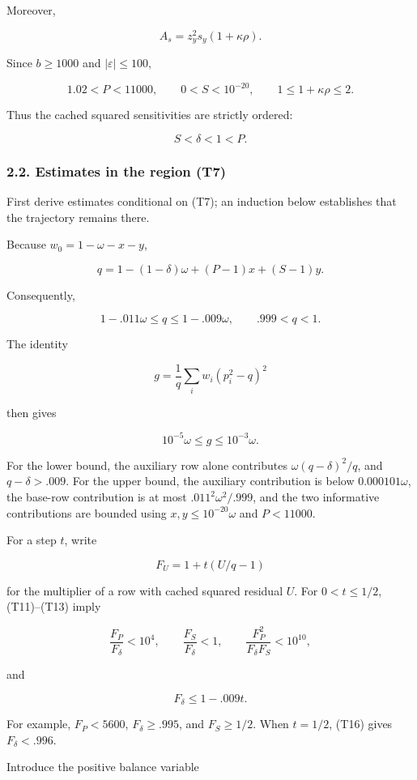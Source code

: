 Moreover,

\[
A_s=z_y^2s_y(1+\kappa\rho).
\tag{T10}
\]

Since \(b\ge1000\) and \(|\varepsilon|\le100\),

\[
1.02<P<11000,\qquad 0<S<10^{-20},
\qquad 1\le1+\kappa\rho\le2.
\tag{T11}
\]

Thus the cached squared sensitivities are strictly ordered:

\[
S<\delta<1<P.
\tag{T12}
\]

\subsubsection{2.2. Estimates in the region (T7)}

First derive estimates conditional on (T7); an induction below establishes that the trajectory remains there.

Because \(w_0=1-\omega-x-y\),

\[
q=1-(1-\delta)\omega+(P-1)x+(S-1)y.
\]

Consequently,

\[
1-.011\omega\le q\le1-.009\omega,
\qquad .999<q<1.
\tag{T13}
\]

The identity

\[
g=\frac1q\sum_i w_i(p_i^2-q)^2
\]

then gives

\[
10^{-5}\omega\le g\le10^{-3}\omega.
\tag{T14}
\]

For the lower bound, the auxiliary row alone contributes
\(\omega(q-\delta)^2/q\), and \(q-\delta>.009\).
For the upper bound, the auxiliary contribution is below
\(0.000101\omega\), the base-row contribution is at most
\(.011^2\omega^2/.999\), and the two informative contributions are bounded using \(x,y\le10^{-20}\omega\) and \(P<11000\).

For a step \(t\), write

\[
F_U=1+t(U/q-1)
\]

for the multiplier of a row with cached squared residual \(U\). For \(0<t\le1/2\), (T11)–(T13) imply

\[
\frac{F_P}{F_\delta}<10^4,\qquad
\frac{F_S}{F_\delta}<1,\qquad
\frac{F_P^2}{F_\delta F_S}<10^{10},
\tag{T15}
\]

and

\[
F_\delta\le1-.009t.
\tag{T16}
\]

For example, \(F_P<5600\), \(F_\delta\ge.995\), and \(F_S\ge1/2\).
When \(t=1/2\), (T16) gives \(F_\delta<.996\).

Introduce the positive balance variable

